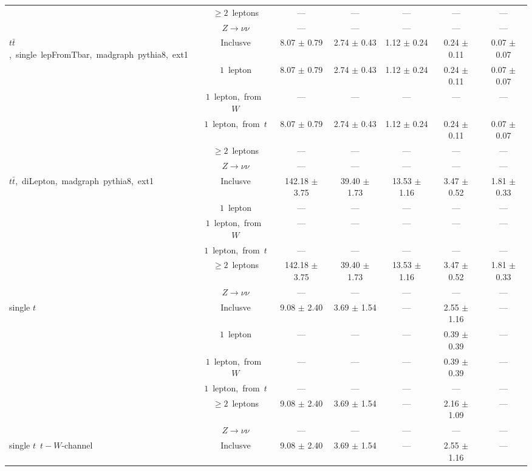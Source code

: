 \documentclass{article}
\begin{document}
\begin{longtable}{|l|c|c|c|c|c|c|}
 & $\ge2$~leptons  & ---  & ---  & ---  & ---  & --- \\* 
 & $Z\rightarrow\nu\nu$  & ---  & ---  & ---  & ---  & --- \\* 
\hline 
\multirow{6}{*}{$t\bar{t}$,~single~lepFromTbar,~madgraph~pythia8,~ext1} & Inclusve  & 8.07 $\pm$ 0.79  & 2.74 $\pm$ 0.43  & 1.12 $\pm$ 0.24  & 0.24 $\pm$ 0.11  & 0.07 $\pm$ 0.07 \\* 
 & $1$~lepton  & 8.07 $\pm$ 0.79  & 2.74 $\pm$ 0.43  & 1.12 $\pm$ 0.24  & 0.24 $\pm$ 0.11  & 0.07 $\pm$ 0.07 \\* 
 & $1$~lepton,~from~$W$  & ---  & ---  & ---  & ---  & --- \\* 
 & $1$~lepton,~from~$t$  & 8.07 $\pm$ 0.79  & 2.74 $\pm$ 0.43  & 1.12 $\pm$ 0.24  & 0.24 $\pm$ 0.11  & 0.07 $\pm$ 0.07 \\* 
 & $\ge2$~leptons  & ---  & ---  & ---  & ---  & --- \\* 
 & $Z\rightarrow\nu\nu$  & ---  & ---  & ---  & ---  & --- \\* 
\hline 
\multirow{6}{*}{$t\bar{t}$,~diLepton,~madgraph~pythia8,~ext1} & Inclusve  & 142.18 $\pm$ 3.75  & 39.40 $\pm$ 1.73  & 13.53 $\pm$ 1.16  & 3.47 $\pm$ 0.52  & 1.81 $\pm$ 0.33 \\* 
 & $1$~lepton  & ---  & ---  & ---  & ---  & --- \\* 
 & $1$~lepton,~from~$W$  & ---  & ---  & ---  & ---  & --- \\* 
 & $1$~lepton,~from~$t$  & ---  & ---  & ---  & ---  & --- \\* 
 & $\ge2$~leptons  & 142.18 $\pm$ 3.75  & 39.40 $\pm$ 1.73  & 13.53 $\pm$ 1.16  & 3.47 $\pm$ 0.52  & 1.81 $\pm$ 0.33 \\* 
 & $Z\rightarrow\nu\nu$  & ---  & ---  & ---  & ---  & --- \\* 
\hline 
\multirow{6}{*}{single $t$} & Inclusve  & 9.08 $\pm$ 2.40  & 3.69 $\pm$ 1.54  & ---  & 2.55 $\pm$ 1.16  & --- \\* 
 & $1$~lepton  & ---  & ---  & ---  & 0.39 $\pm$ 0.39  & --- \\* 
 & $1$~lepton,~from~$W$  & ---  & ---  & ---  & 0.39 $\pm$ 0.39  & --- \\* 
 & $1$~lepton,~from~$t$  & ---  & ---  & ---  & ---  & --- \\* 
 & $\ge2$~leptons  & 9.08 $\pm$ 2.40  & 3.69 $\pm$ 1.54  & ---  & 2.16 $\pm$ 1.09  & --- \\* 
 & $Z\rightarrow\nu\nu$  & ---  & ---  & ---  & ---  & --- \\* 
\hline 
\multirow{6}{*}{single $t$~$t-W$-channel} & Inclusve  & 9.08 $\pm$ 2.40  & 3.69 $\pm$ 1.54  & ---  & 2.55 $\pm$ 1.16  & --- \\* 

\end{longtable}
\end{document}
